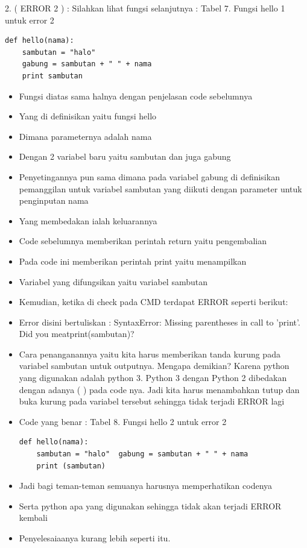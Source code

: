 2. ( ERROR 2 ) : Silahkan lihat fungsi selanjutnya :
Tabel 7. Fungsi hello 1 untuk error 2  
\begin{verbatim}
def hello(nama):  
	sambutan = "halo" 
	gabung = sambutan + " " + nama 
 	print sambutan
\end{verbatim}
\begin{itemize}
\item Fungsi diatas sama halnya dengan penjelasan code sebelumnya 
\item Yang di definisikan yaitu fungsi hello 
\item Dimana parameternya adalah nama 
\item Dengan 2 variabel baru yaitu sambutan dan juga gabung 
\item Penyetingannya pun sama dimana pada variabel gabung di definisikan pemanggilan untuk variabel sambutan yang diikuti dengan parameter untuk penginputan nama
\item Yang membedakan ialah keluarannya 
\item Code sebelumnya memberikan perintah return yaitu pengembalian 
\item Pada code ini memberikan perintah print yaitu menampilkan 
\item Variabel yang difungsikan yaitu variabel sambutan 
\item Kemudian, ketika di check pada CMD terdapat ERROR seperti berikut: 
\item Error disini bertuliskan : SyntaxError: Missing parentheses in call to 'print'. Did you meatprint(sambutan)? 
\item Cara penanganannya yaitu kita harus memberikan tanda kurung pada variabel sambutan untuk outputnya. Mengapa demikian? Karena python yang digunakan adalah python 3. Python 3 dengan Python 2 dibedakan dengan adanya ( ) pada code nya. Jadi kita harus menambahkan tutup dan buka kurung pada variabel tersebut sehingga tidak terjadi ERROR lagi 
\item Code yang benar : 
Tabel 8. Fungsi hello 2 untuk error 2 
\begin{verbatim}
def hello(nama):  
	sambutan = "halo"  gabung = sambutan + " " + nama 
	print (sambutan)
\end{verbatim} 
\item Jadi bagi teman-teman semuanya harusnya memperhatikan codenya 
\item Serta python apa yang digunakan sehingga tidak akan terjadi ERROR kembali 
\item Penyelesaiaanya kurang lebih seperti itu. 
\end{itemize}

